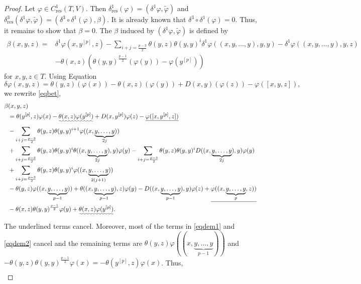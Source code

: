 \documentclass[11pt, twoside]{article}
\begin{document}
\begin{proof}
    Let $\varphi\in C_\mathrm{res}^1(T,V). $ Then $\delta_\mathrm{res}^1(\varphi)=(\delta^1\varphi,\tilde{\varphi}) $ and $\delta_\mathrm{res}^3(\delta^1\varphi,\tilde{\varphi})= (\delta^3\circ\delta^1(\varphi),\beta) $. It is already known that $\delta^3\circ\delta^1(\varphi)=0 $. Thus, it remains to show that $\beta=0 $. The $\beta$ induced by $(\delta^1\varphi,\tilde{\varphi})$ is defined by \begin{equation}\label{eqbet}\begin{aligned}
        \beta(x,y,z)=& \delta^1\varphi(x,y^{[p]},z)- \sum_{i+j=\frac{p-3}{2}}\theta(y,z)\theta(y,y)^i\delta^1\varphi((x,y,\ldots,y),y,y) - \delta^1\varphi((x,y,\ldots,y),y,z) \\ &- \theta(x,z)(\theta(y,y)^{\frac{p-1}{2}}(\varphi(y)) - \varphi(y^{[p]})) \end{aligned}
    \end{equation} for $x,y,z\in T$. Using Equation $$\delta \varphi(x,y,z)= \theta(y,z)(\varphi(x))- \theta(x,z)(\varphi(y))+D(x,y)(\varphi(z))- \varphi([x,y,z]), $$ we rewrite \eqref{eqbet},  \begin{align}
        \beta&(x,y,z)\notag \\&= \theta(y^{[p]},z)\varphi(x)- \uwave{\theta(x,z)\varphi(y^{[p]})}+ D(x,y^{[p]})\varphi(z)-\uline{\varphi([x,y^{[p]},z])}\notag \\ &- \sum\limits_{i+j=\frac{p-3}{2}}\theta(y,z)\theta(y,y)^{i+1}\varphi((x,\underbrace{y,\ldots,y}_{2j}))\label{eqdem1} \\ &+ \sum\limits_{i+j=\frac{p-3}{2}}\theta(y,z)\theta(y,y)^i\theta((x,\underbrace{y,\ldots,y}_{2j}),y)\varphi(y) - \sum\limits_{i+j=\frac{p-3}{2}}\theta(y,z)\theta(y,y)^iD((x,\underbrace{y,\ldots,y}_{2j}),y)\varphi(y)\notag \\ &+ \sum\limits_{i+j=\frac{p-3}{2}}\theta(y,z)\theta(y,y)^i\varphi((x,\underbrace{y,\ldots,y}_{2(j+1)}))\label{eqdem2} \\ &- \theta(y,z)\varphi((x,\underbrace{y,\ldots,y}_{p-1}))+ \theta((x,\underbrace{y,\ldots,y}_{p-1}),z)\varphi(y)-D((x,\underbrace{y,\ldots,y}_{p-1}),y)\varphi(z)+ \uline{\varphi((x,\underbrace{y,\ldots,y}_{p},z))}\notag \\ &- \theta(x,z)\theta(y,y)^{\frac{p-1}{2}}\varphi(y) + \uwave{\theta(x,z)\varphi(y^{[p]})}\notag.
    \end{align} The underlined terms cancel. Moreover, most of the terms in \eqref{eqdem1} and \eqref{eqdem2} cancel and the remaining terms are $\theta(y,z)\varphi((x,\underbrace{y,\ldots,y}_{p-1}))$ and $- \theta(y,z)\theta(y,y)^{\frac{p-1}{2}}\varphi(x)= -\theta(y^{[p]},z)\varphi(x) $. Thus, \begin{align}

\end{align}
\end{proof}
\end{document}
